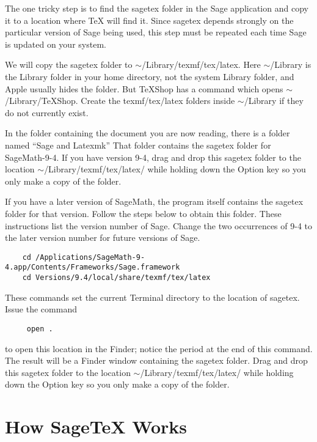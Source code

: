 \documentclass[11pt, oneside]{amsart}
\begin{document}
The one tricky step is to find the sagetex folder in the Sage application  and copy it to a location where TeX will find it. Since sagetex depends strongly on the particular version of Sage being used, this step must be repeated each time Sage is updated on your system. 

We will copy the sagetex folder to $\sim$/Library/texmf/tex/latex. Here $\sim$/Library is the Library folder in your home directory, not the system Library folder, and Apple usually hides the folder. But TeXShop has a command which opens
$\sim$/Library/TeXShop. Create the texmf/tex/latex folders inside $\sim$/Library if they do not currently exist.

In the folder containing the document you are now reading, there is a folder named ``Sage and Latexmk''  That folder contains the sagetex folder for SageMath-9-4. If you have version 9-4, drag and drop this sagetex folder to the location
$\sim$/Library/texmf/tex/latex/ while holding down the Option key so you only make a copy of the folder.

If you have a later version of SageMath, the program itself contains the sagetex folder for that version. Follow the steps below to obtain this folder. These instructions list the version number of Sage. Change the two occurrences of 9-4 to the later version number for future versions of Sage.
\begin{verbatim}
    cd /Applications/SageMath-9-4.app/Contents/Frameworks/Sage.framework
    cd Versions/9.4/local/share/texmf/tex/latex
\end{verbatim}

These commands set the current Terminal directory to the location of sagetex. Issue the command
\begin{verbatim}
     open .
\end{verbatim}

to open this location in the Finder; notice the period at the end of this command. The result will be a Finder window containing the sagetex folder. Drag and drop this sagetex folder to the location
$\sim$/Library/texmf/tex/latex/ while holding down the Option key so you only make a copy of the folder.



\section{How SageTeX Works}
\end{document}
